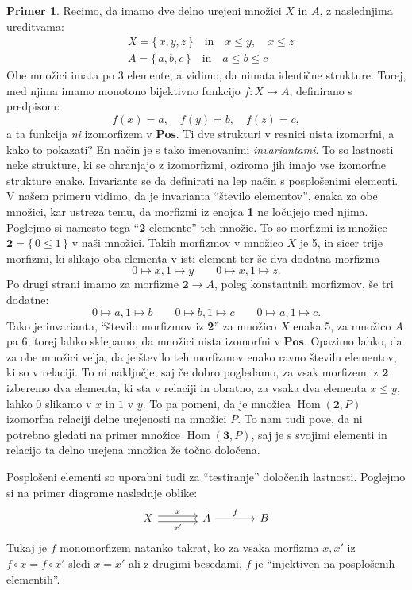 \documentclass[12pt,a4paper]{book}
\theoremstyle{definition}
\theoremstyle{plain}
\theoremstyle{definition}
\newtheorem{primer}{Primer}[section]
\theoremstyle{remark}
\newcommand{\cat}[1]{\textbf{#1}}
\DeclareMathOperator{\Hom}{Hom}
\renewcommand{\set}[1]{\{\,#1\,\}}
\begin{document}
\begin{primer}
Recimo, da imamo dve delno urejeni množici $X$ in $A$, z naslednjima ureditvama:
\begin{align*}
&X = \set{x,y,z} \quad \text{in} \quad x \leq y,\quad x \leq z \\
&A = \set{a, b, c} \quad \text{in} \quad a \leq b \leq c
\end{align*}
Obe množici imata po 3 elemente, a vidimo, da nimata identične strukture. Torej, med njima imamo monotono bijektivno funkcijo $f : X \to A$, definirano s predpisom:
$$f(x) = a, \quad f(y) = b, \quad f(z) = c,$$
a ta funkcija \emph{ni} izomorfizem v $\cat{Pos}$. Ti dve strukturi v resnici nista izomorfni, a kako to pokazati? En način je s tako imenovanimi \emph{invariantami}. To so lastnosti neke strukture, ki se ohranjajo z izomorfizmi, oziroma jih imajo vse izomorfne strukture enake. Invariante se da definirati na lep način s posplošenimi elementi. V našem primeru vidimo, da je invarianta "`število elementov"', enaka za obe množici, kar ustreza temu, da morfizmi iz enojca \textbf{1} ne ločujejo med njima. Poglejmo si namesto tega "`\textbf{2}-elemente"' teh množic. To so morfizmi iz množice $\textbf{2} = \set{0 \leq 1}$ v naši množici. Takih morfizmov v množico $X$ je 5, in sicer trije morfizmi, ki slikajo oba elementa v isti element ter še dva dodatna morfizma
$$0 \mapsto x, 1 \mapsto y \qquad 0 \mapsto x, 1 \mapsto z.$$
Po drugi strani imamo za morfizme $\textbf{2} \to A$, poleg konstantnih morfizmov, še tri dodatne:
$$0 \mapsto a, 1 \mapsto b \qquad 0 \mapsto b, 1 \mapsto c \qquad 0 \mapsto a, 1 \mapsto c.$$
Tako je invarianta, "`število morfizmov iz \textbf{2}"' za množico $X$ enaka 5, za množico $A$ pa 6, torej lahko sklepamo, da množici nista izomorfni v $\cat{Pos}$. Opazimo lahko, da za obe množici velja, da je število teh morfizmov enako ravno številu elementov, ki so v relaciji. To ni naključje, saj če dobro pogledamo, za vsak morfizem iz $\cat{2}$ izberemo dva elementa, ki sta v relaciji in obratno, za vsaka dva elementa $x \leq y$, lahko $0$ slikamo v $x$ in $1$ v $y$. To pa pomeni, da je množica $\Hom(\cat{2}, P)$ izomorfna relaciji delne urejenosti na množici $P$. To nam tudi pove, da ni potrebno gledati na primer množice $\Hom(\cat{3}, P)$, saj je s svojimi elementi in relacijo ta delno urejena množica že točno določena.
\end{primer}
%
Posplošeni elementi so uporabni tudi za "`testiranje"' določenih lastnosti. Poglejmo si na primer diagrame naslednje oblike:
%
$$\begin{tikzcd}[column sep=large]
X \ar[r, shift left, "x"] \ar[r, shift right, "x'"'] & A \ar[r, "f"] & B
\end{tikzcd}$$
Tukaj je $f$ monomorfizem natanko takrat, ko za vsaka morfizma $x, x'$ iz $f \circ x = f \circ x'$ sledi $x = x'$ ali z drugimi besedami, $f$ je "`injektiven na posplošenih elementih"'.
%
\end{document}
